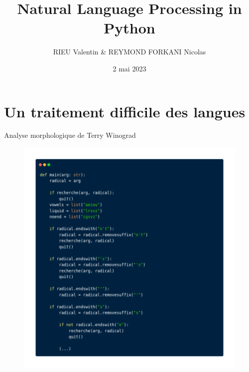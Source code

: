 

\title{Natural Language Processing in Python}
\author{RIEU Valentin \& REYMOND FORKANI Nicolas}
\date{2 mai 2023}




\begin{frame}
    \titlepage
\end{frame}

\section{Un traitement difficile des langues}

\begin{frame}{Analyse morphologique de Terry Winograd}
\begin{figure}[ht]
\includegraphics[scale=.23]{img/ex_morpho.png}

\end{figure}
\end{frame}

